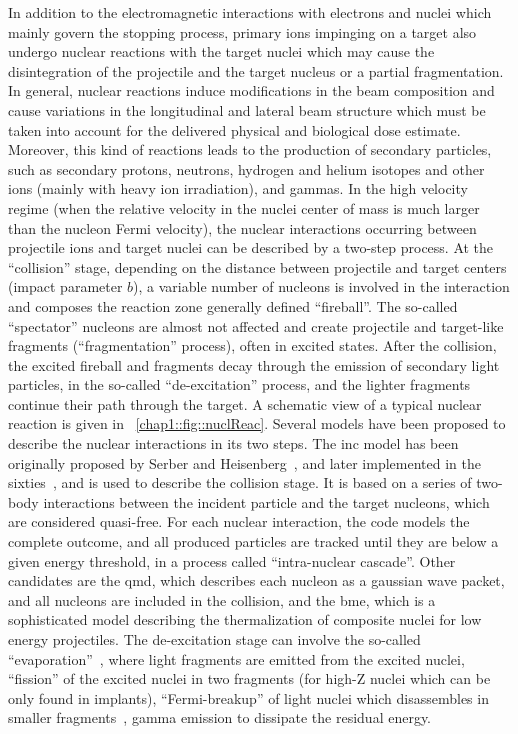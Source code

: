 In addition to the electromagnetic interactions with electrons and nuclei   which mainly govern the stopping process, primary ions impinging on a target also undergo nuclear reactions with the target nuclei which may cause the disintegration of the projectile and the target nucleus or a partial fragmentation. In general, nuclear reactions induce modifications in the beam composition and cause variations in the longitudinal and lateral beam structure which must be taken into account for the delivered physical and biological dose estimate. Moreover, this kind of reactions leads to the production of secondary particles, such as secondary protons, neutrons, hydrogen and helium isotopes and other ions (mainly with heavy ion irradiation), and gammas.
In the high velocity regime (when the relative velocity in the nuclei center of mass is much larger than the nucleon Fermi velocity), the nuclear interactions occurring between projectile ions and target nuclei can be described by a two-step process. At the \enquote{collision} stage, depending on the distance between projectile and target centers (impact parameter $b$), a variable number of nucleons is involved in the interaction and composes the reaction zone generally defined \enquote{fireball}. The so-called \enquote{spectator} nucleons are almost not affected and create projectile and target-like fragments (\enquote{fragmentation} process), often in excited states. After the collision, the excited fireball and fragments decay through the emission of secondary light particles, in the so-called \enquote{de-excitation} process, and the lighter fragments continue their path through the target. A schematic view of a typical nuclear reaction is given in \figurename~\ref{chap1::fig::nuclReac}. 
Several models have been proposed to describe the nuclear interactions in its two steps. The \gls{inc} model has been originally proposed by Serber and Heisenberg~\parencite{Serber1947}, and later implemented in the sixties~\parencite{Bertini1974}, and is used to describe the collision stage. It is based on a series of two-body interactions between the incident particle and the target nucleons, which are considered quasi-free. For each nuclear interaction, the code models the complete outcome, and all produced particles are tracked until they are below a given energy threshold, in a process called \enquote{intra-nuclear cascade}. Other candidates are the \gls{qmd}, which describes each nucleon as a gaussian wave packet, and all nucleons are included in the collision, and the \gls{bme}, which is a sophisticated model describing the thermalization of composite nuclei for low energy projectiles. The de-excitation stage can involve the so-called \enquote{evaporation}~\parencite{Weisskopf1937}, where light fragments are emitted from the excited nuclei, \enquote{fission} of the excited nuclei in two fragments (for high-Z nuclei which can be only found in implants), \enquote{Fermi-breakup} of light nuclei which disassembles in smaller fragments~\parencite{Fermi1950}, gamma emission to dissipate the residual energy. 
